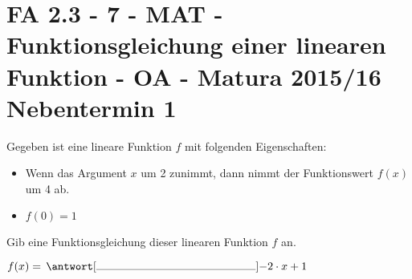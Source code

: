 \section{FA 2.3 - 7 - MAT - Funktionsgleichung einer linearen Funktion - OA - Matura 2015/16 Nebentermin 1}

\begin{beispiel}[FA 2.3]{1} %
Gegeben ist eine lineare Funktion $f$ mit folgenden Eigenschaften:

\begin{itemize}
	\item Wenn das Argument $x$ um 2 zunimmt, dann nimmt der Funktionswert $f(x)$ um 4 ab.
	\item $f(0)=1$
\end{itemize} 


Gib eine Funktionsgleichung dieser linearen Funktion $f$ an. \leer

$f(x)=\,\antwort[\rule{5cm}{0.3pt}]{-2\cdot x +1}$
\end{beispiel}